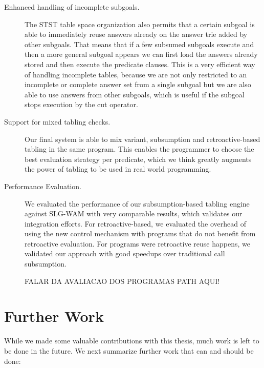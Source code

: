 \begin{description}
   \item[Enhanced handling of incomplete subgoals.] The STST table space organization also permits that a certain
   subgoal is able to immediately reuse answers already on the answer trie added by other subgoals. That means that if a
   few subsumed subgoals execute and then a more general subgoal appears we can first load the answers already stored and
   then execute the predicate clauses. This is a very efficient way of handling incomplete tables, because we are
   not only restricted to an incomplete or complete answer set from a single subgoal but we are also able to use
   answers from other subgoals, which is useful if the subgoal stops execution by the cut operator.
   
   \item[Support for mixed tabling checks.] Our final system is able to mix variant, subsumption and retroactive-based
   tabling in the same program. This enables the programmer to choose the best evaluation strategy per predicate,
   which we think greatly augments the power of tabling to be used in real world programming.
   
   \item[Performance Evaluation.] We evaluated the performance of our subsumption-based tabling engine against SLG-WAM
   with very comparable results, which validates our integration efforts. For retroactive-based, we evaluated the overhead
   of using the new control mechanism with programs that do not benefit from retroactive evaluation. For programs were
   retroactive reuse happens, we validated our approach with good speedups over traditional call subsumption.
   
   FALAR DA AVALIACAO DOS PROGRAMAS PATH AQUI!
   
\end{description}


\section{Further Work}

While we made some valuable contributions with this thesis, much work is left to be done in the future.
We next summarize further work that can and should be done:

